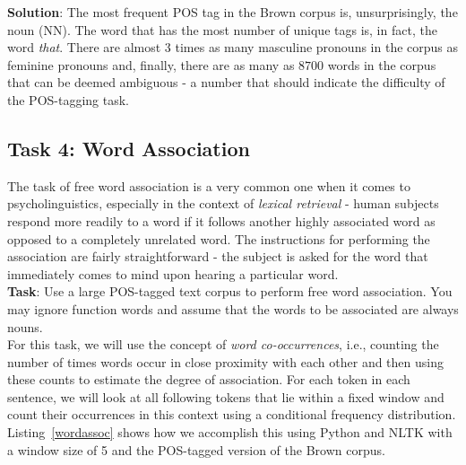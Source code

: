 \documentclass[11pt]{article}
\begin{document}
\noindent \textbf{Solution}: The most frequent POS tag in the Brown corpus is, unsurprisingly, the noun (NN). The word that has the most number of unique tags is, in fact, the word \emph{that}. There are almost 3 times as many masculine pronouns in the corpus as feminine pronouns and, finally, there are as many as $8700$ words in the corpus that can be deemed ambiguous - a number that should indicate the difficulty of the POS-tagging task.

\subsection{Task 4: Word Association} %
\label{sub:task_4_word_association}

The task of free word association is a very common one when it comes to psycholinguistics, especially in the context of \emph{lexical retrieval} - human subjects respond more readily to a word if it follows another highly associated word as opposed to a completely unrelated word. The instructions for performing the association are fairly straightforward - the subject is asked for the word that immediately comes to mind upon hearing a particular word.\\

\noindent \textbf{Task}: Use a large POS-tagged text corpus to perform free word association. You may ignore function words and assume that the words to be associated are always nouns. \\

\noindent For this task, we will use the concept of \emph{word co-occurrences}, i.e., counting the number of times words occur in close proximity with each other and then using these counts to estimate the degree of association. For each token in each sentence, we will look at all following tokens that lie within a fixed window and count their occurrences in this context using a conditional frequency distribution. Listing~\ref{wordassoc} shows how we accomplish this using Python and NLTK with a window size of 5 and the POS-tagged version of the Brown corpus. \\
\end{document}
